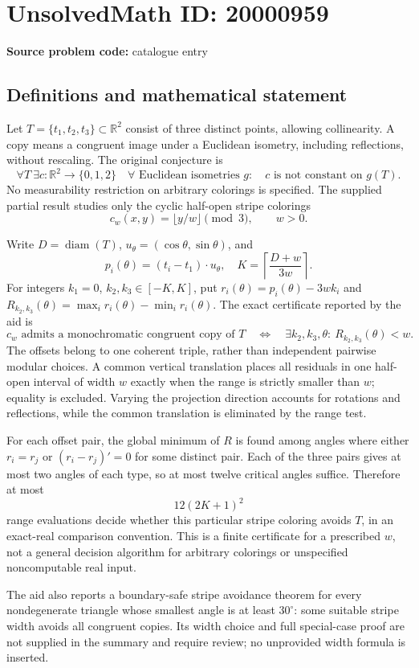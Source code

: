 \documentclass[11pt]{article}
\newcommand{\R}{\mathbb{R}}
\begin{document}
\section*{UnsolvedMath ID: 20000959}
\textbf{Source problem code:} catalogue entry
\subsection{Definitions and mathematical statement}
Let \(T=\{t_1,t_2,t_3\}\subset\R^2\) consist of three distinct points, allowing collinearity. A copy means a congruent image under a Euclidean isometry, including reflections, without rescaling. The original conjecture is
\[
 \forall T\ \exists c:\R^2\to\{0,1,2\}\quad
 \forall\text{ Euclidean isometries }g:\quad c\text{ is not constant on }g(T).
\]
No measurability restriction on arbitrary colorings is specified. The supplied partial result studies only the cyclic half-open stripe colorings
\[
 c_w(x,y)=\lfloor y/w\rfloor\pmod3,\qquad w>0.
\]

Write \(D=\operatorname{diam}(T)\), \(u_\theta=(\cos\theta,\sin\theta)\), and
\[
 p_i(\theta)=(t_i-t_1)\cdot u_\theta,\quad
 K=\left\lceil\frac{D+w}{3w}\right\rceil.
\]
For integers \(k_1=0\), \(k_2,k_3\in[-K,K]\), put \(r_i(\theta)=p_i(\theta)-3wk_i\) and \(R_{k_2,k_3}(\theta)=\max_i r_i(\theta)-\min_i r_i(\theta)\). The exact certificate reported by the aid is
\[
 c_w\text{ admits a monochromatic congruent copy of }T
 \quad\Longleftrightarrow\quad
 \exists k_2,k_3,\theta:\ R_{k_2,k_3}(\theta)<w.
\]
The offsets belong to one coherent triple, rather than independent pairwise modular choices. A common vertical translation places all residuals in one half-open interval of width \(w\) exactly when the range is strictly smaller than \(w\); equality is excluded. Varying the projection direction accounts for rotations and reflections, while the common translation is eliminated by the range test.

For each offset pair, the global minimum of \(R\) is found among angles where either \(r_i=r_j\) or \((r_i-r_j)'=0\) for some distinct pair. Each of the three pairs gives at most two angles of each type, so at most twelve critical angles suffice. Therefore at most
\[
 12(2K+1)^2
\]
range evaluations decide whether this particular stripe coloring avoids \(T\), in an exact-real comparison convention. This is a finite certificate for a prescribed \(w\), not a general decision algorithm for arbitrary colorings or unspecified noncomputable real input.

The aid also reports a boundary-safe stripe avoidance theorem for every nondegenerate triangle whose smallest angle is at least \(30^\circ\): some suitable stripe width avoids all congruent copies. Its width choice and full special-case proof are not supplied in the summary and require review; no unprovided width formula is inserted.
\end{document}
